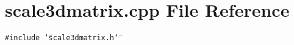 \section{scale3dmatrix.cpp File Reference}
\label{scale3dmatrix_8cpp}
{\tt \#include \char`\"{}scale3dmatrix.h\char`\"{}}\par
